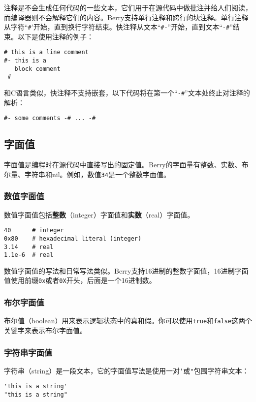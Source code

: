 注释是不会生成任何代码的一些文本，它们用于在源代码中做批注并给人们阅读，而编译器则不会解释它们的内容。Berry支持单行注释和跨行的块注释。单行注释从字符``\texttt{\#}'开始，直到换行字符结束。快注释从文本``\texttt{\#-}''开始，直到文本``\texttt{-\#}''结束。以下是使用注释的例子：
\begin{lstlisting}[language=berry, numbers=none]
# this is a line comment
#- this is a
   block comment
-#
\end{lstlisting}

和C语言类似，快注释不支持嵌套，以下代码将在第一个``\texttt{-\#}''文本处终止对注释的解析：
\begin{lstlisting}[language=berry, numbers=none]
#- some comments -# ... -#
\end{lstlisting}

\subsection{字面值}

字面值是编程时在源代码中直接写出的固定值。Berry的字面量有整数、实数、布尔量、字符串和nil。例如，数值\texttt{34}是一个整数字面值。

\subsubsection{数值字面值}

数值字面值包括\textbf{整数}（integer）字面值和\textbf{实数}（real）字面值。
\begin{lstlisting}[language=berry, numbers=none]
40      # integer
0x80    # hexadecimal literal (integer)
3.14    # real
1.1e-6  # real
\end{lstlisting}

数值字面值的写法和日常写法类似。Berry支持16进制的整数字面值，16进制字面值使用前缀\texttt{0x}或者\texttt{0X}开头，后面是一个16进制数。

\subsubsection{布尔字面值}

布尔值（boolean）用来表示逻辑状态中的真和假。你可以使用\texttt{true}和\texttt{false}这两个关键字来表示布尔字面值。

\subsubsection{字符串字面值}

字符串（string）是一段文本，它的字面值写法是使用一对\texttt{'}或\texttt{"}包围字符串文本：
\begin{lstlisting}[language=berry, numbers=none]
'this is a string'
"this is a string"
\end{lstlisting}

